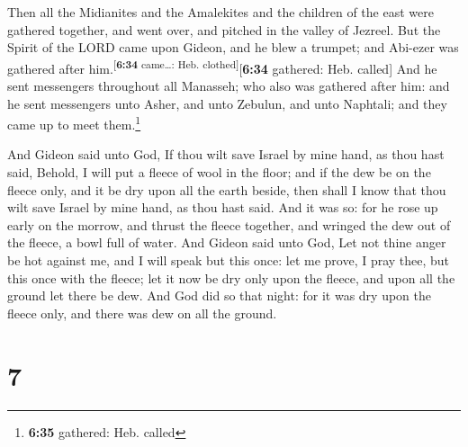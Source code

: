  Then all the Midianites and the Amalekites and the
children of the east were gathered together, and went over, and pitched
in the valley of Jezreel.  But the Spirit of the LORD
came upon Gideon, and he blew a trumpet; and Abi-ezer was gathered after
him.\textsuperscript{{[}\textbf{6:34} came\ldots: Heb.
clothed{]}}{[}\textbf{6:34} gathered: Heb. called{]}  And
he sent messengers throughout all Manasseh; who also was gathered after
him: and he sent messengers unto Asher, and unto Zebulun, and unto
Naphtali; and they came up to meet them.\footnote{\textbf{6:35}
  gathered: Heb. called}

 And Gideon said unto God, If thou wilt save Israel by
mine hand, as thou hast said,  Behold, I will put a
fleece of wool in the floor; and if the dew be on the fleece only, and
it be dry upon all the earth beside, then shall I know that thou wilt
save Israel by mine hand, as thou hast said.  And it was
so: for he rose up early on the morrow, and thrust the fleece together,
and wringed the dew out of the fleece, a bowl full of water.
 And Gideon said unto God, Let not thine anger be hot
against me, and I will speak but this once: let me prove, I pray thee,
but this once with the fleece; let it now be dry only upon the fleece,
and upon all the ground let there be dew.  And God did so
that night: for it was dry upon the fleece only, and there was dew on
all the ground.

\hypertarget{section-6}{%
\section{7}\label{section-6}}

